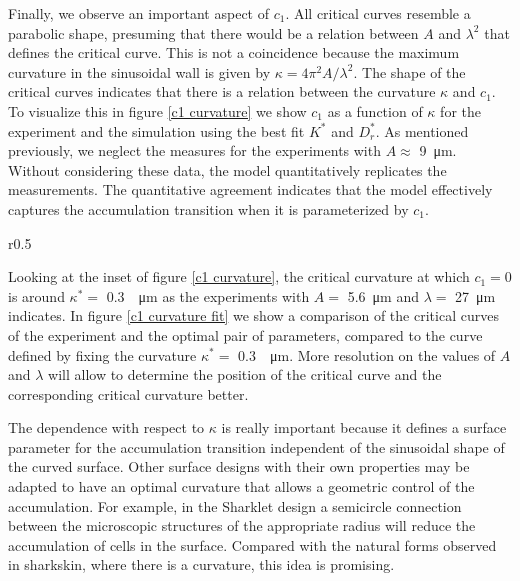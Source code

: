 Finally, we observe an important aspect of $c_1$. All critical curves resemble a parabolic shape, presuming that there would be a relation between $A$ and $\lambda^2$ that defines the critical curve. This is not a coincidence because the maximum curvature in the sinusoidal wall is given by $\kappa=4\pi^2A/\lambda^2$. The shape of the critical curves indicates that there is a relation between the curvature $\kappa$ and $c_1$. To visualize this in figure \ref{c1 curvature} we show $c_1$ as a function of $\kappa$ for the experiment and the simulation using the best fit $K^*$ and $D_r^*$. As mentioned previously, we neglect the measures for the experiments with $A\approx$ \SI{9}{\micro\meter}. Without considering these data, the model quantitatively replicates the measurements. The quantitative agreement indicates that the model effectively captures the accumulation transition when it is parameterized by $c_1$.  

\newpage

\begin{wrapfigure}{r}{0.5\linewidth}
\centering

\caption[Comparison of the accumulation transition curves for experiments and the optimal set of parameter with the curvature define by constant curvature $\kappa^*=0.3$]{Comparison of the accumulation transition curves for experiments and the optimal set of parameter with the curvature define by constant curvature $\kappa^*=0.3$. The $c_1$ values correspond to the experimental values.  }
\label{c1 curvature fit}
\end{wrapfigure}

Looking at the inset of figure \ref{c1 curvature}, the critical curvature at which $c_1=0$ is around $\kappa^* =$ \SI{0.3}{\per \micro \meter} as the experiments with $A=$ \SI{5.6}{\micro\meter} and $\lambda=$ \SI{27}{\micro\meter} indicates. In figure \ref{c1 curvature fit} we show a comparison of the critical curves of the experiment and the optimal pair of parameters, compared to the curve defined by fixing the curvature $\kappa^* =$ \SI{0.3}{\per \micro \meter}. More resolution on the values of $A$ and $\lambda$ will allow to determine the position of the critical curve and the corresponding critical curvature better. 


The dependence with respect to $\kappa$ is really important because it defines a surface parameter for the accumulation transition independent of the sinusoidal shape of the curved surface. Other surface designs with their own properties may be adapted to have an optimal curvature that allows a geometric control of the accumulation. For example, in the Sharklet design \cite{Reddy2011MicropatternedColi} a semicircle connection between the microscopic structures of the appropriate radius will reduce the accumulation of cells in the surface. Compared with the natural forms observed in sharkskin, where there is a curvature, this idea is promising.


